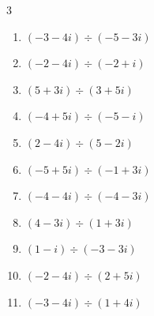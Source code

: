 \begin{multicols}{3}
\begin{enumerate}
        \phantom{$\displaystyle =4-i$}

\columnbreak %

  \item $\displaystyle (-3-4i)\div(-5-3i)$


  \item $\displaystyle (-2-4i)\div(-2+i)$

        \phantom{$\displaystyle =2i$}

  \item $\displaystyle (5+3i)\div(3+5i)$


  \item $\displaystyle (-4+5i)\div(-5-i)$


  \item $\displaystyle (2-4i)\div(5-2i)$


  \item $\displaystyle (-5+5i)\div(-1+3i)$

        \phantom{$\displaystyle =2+i$}

  \item $\displaystyle (-4-4i)\div(-4-3i)$


  \item $\displaystyle (4-3i)\div(1+3i)$


  \item $\displaystyle (1-i)\div(-3-3i)$


  \item $\displaystyle (-2-4i)\div(2+5i)$


\columnbreak %

\resetques

  \item $\displaystyle (-3-4i)\div(1+4i)$



\end{enumerate}
\end{multicols}
